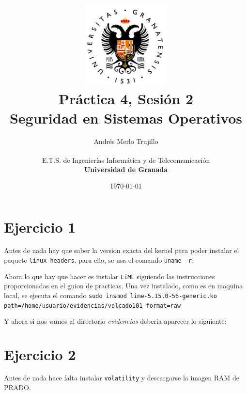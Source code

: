 \documentclass{article}
\title{
\includegraphics[width=1.75in]{imagenes/UGR-Logo.png} \\
\vspace*{1in}
\textbf{Práctica 4, Sesión 2} \\
Seguridad en Sistemas Operativos \\
\vspace*{0.5in}}
\author{Andrés Merlo Trujillo \\
\vspace*{0.5in} \\
E.T.S. de Ingenierías Informática y de Telecomunicación \\
\textbf{Universidad de Granada}} \date{\today}
\begin{document}
\begin{titlingpage}
\maketitle
\end{titlingpage}

\newpage

\tableofcontents

\newpage

\pagestyle{fancy}

\section{Ejercicio 1}

Antes de nada hay que saber la version exacta del kernel para poder instalar el paquete \verb|linux-headers|, para ello, se usa el comando \verb|uname -r|:


Ahora lo que hay que hacer es instalar \verb|LiME| siguiendo las instrucciones proporcionadas en el guion de practicas. Una vez instalado, como es en maquina local, se ejecuta el comando \verb|sudo insmod lime-5.15.0-56-generic.ko path=/home/usuario/evidencias/volcado101 format=raw|


Y ahora si nos vamos al directorio \textit{evidencias} deberia aparecer lo siguiente:


\section{Ejercicio 2}

Antes de nada hace falta instalar \verb|volatility| y descargarse la imagen RAM de PRADO.
\end{document}
